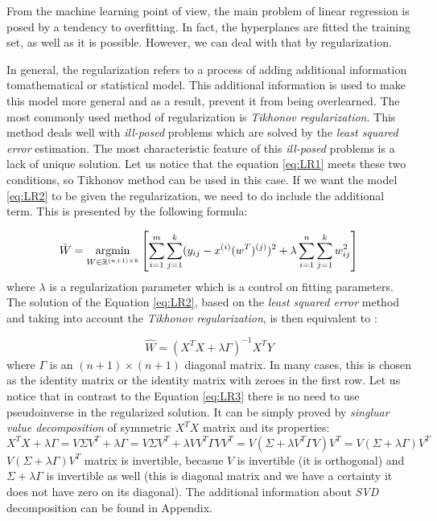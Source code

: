 From the machine learning point of view, the main problem of linear regression is posed by a tendency to overfitting. In fact, the hyperplanes are fitted the training set, as well as it is possible. However, we can deal with that by regularization.

In general, the regularization refers to a process of adding additional information tomathematical or statistical model. This additional information is used to make this model more general and as a result, prevent it from being overlearned. The most commonly used method of regularization is \textit{Tikhonov regularization}. This method deals well with \textit{ill-posed} problems which are solved by the \textit{least squared error} estimation. The most characteristic feature of this \textit{ill-posed} problems is a lack of unique solution. Let us notice that the equation \ref{eq:LR1} meets these two conditions, so Tikhonov method can be used in this case. If we want the model \ref{eq:LR2} to be given the regularization, we need to do include the additional term. This is presented by the following formula:

\begin{equation}\label{eq:LR2}
    \hat{W} = \operatorname*{argmin}_{W \in \mathbb{R}^{(n+1) \times k}}\left[\sum\limits_{i=1}^{m}\sum\limits_{j=1}^{k}(y_{ij}-x^{(i)}(w^T)^{(j)})^2 + \lambda\sum\limits_{i=1}^{n}\sum\limits_{j=1}^{k}w_{ij}^2\right]
\end{equation}
where $\lambda$ is a regularization parameter which is a control on fitting parameters. The solution of the Equation \ref{eq:LR2}, based on the \textit{least squared error} method and taking into account the \textit{Tikhonov regularization}, is then equivalent to \cite{Tikh}:

\begin{equation}\label{eq:LR3}
    \hat{W} = (X^TX+\lambda\Gamma)^{-1}X^TY
\end{equation}
where $\Gamma$ is an $(n+1)\times(n+1)$ diagonal matrix. In many cases, this is chosen as the identity matrix or the identity matrix with zeroes in the first row. Let us notice that in contrast to the Equation \ref{eq:LR3} there is no need to use pseudoinverse in the regularized solution. It can be simply proved by \textit{singluar value decomposition} of symmetric $X^TX$ matrix and its properties:
\begin{equation}\label{eq:inv_proof}
    X^TX + \lambda\Gamma=V\Sigma{V^T} + \lambda\Gamma = V\Sigma{V^T} + \lambda{V}V^T\Gamma{V}V^T = V(\Sigma + \lambda{V^T}\Gamma{V})V^T = V(\Sigma + \lambda\Gamma)V^T 
\end{equation}
$V(\Sigma + \lambda\Gamma)V^T$ matrix is invertible, becasue $V$ is invertible (it is orthogonal) and $\Sigma +\lambda\Gamma$ is invertible as well (this is diagonal matrix and we have a certainty it does not have zero on its diagonal). The additional information about \textit{SVD} decomposition can be found in Appendix.

